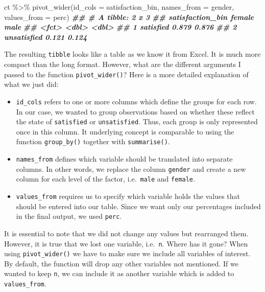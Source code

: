 \documentclass[
]{book}
\newenvironment{Shaded}{\begin{snugshade}}{\end{snugshade}}
\newcommand{\AttributeTok}[1]{\textcolor[rgb]{0.77,0.63,0.00}{#1}}
\newcommand{\DocumentationTok}[1]{\textcolor[rgb]{0.56,0.35,0.01}{\textbf{\textit{#1}}}}
\newcommand{\FunctionTok}[1]{\textcolor[rgb]{0.00,0.00,0.00}{#1}}
\newcommand{\NormalTok}[1]{#1}
\newcommand{\SpecialCharTok}[1]{\textcolor[rgb]{0.00,0.00,0.00}{#1}}
\begin{document}
\begin{Shaded}
\begin{Highlighting}[]
\NormalTok{ct }\SpecialCharTok{\%\textgreater{}\%} \FunctionTok{pivot\_wider}\NormalTok{(}\AttributeTok{id\_cols =}\NormalTok{ satisfaction\_bin,}
                   \AttributeTok{names\_from =}\NormalTok{ gender,}
                   \AttributeTok{values\_from =}\NormalTok{ perc)}
\DocumentationTok{\#\# \# A tibble: 2 x 3}
\DocumentationTok{\#\#   satisfaction\_bin female  male}
\DocumentationTok{\#\#   \textless{}fct\textgreater{}             \textless{}dbl\textgreater{} \textless{}dbl\textgreater{}}
\DocumentationTok{\#\# 1 satisfied         0.879 0.876}
\DocumentationTok{\#\# 2 unsatisfied       0.121 0.124}
\end{Highlighting}
\end{Shaded}

The resulting \texttt{tibble} looks like a table as we know it from Excel. It is much more compact than the long format. However, what are the different arguments I passed to the function \texttt{pivot\_wider()}? Here is a more detailed explanation of what we just did:

\begin{itemize}
\item
  \texttt{id\_cols} refers to one or more columns which define the groups for each row. In our case, we wanted to group observations based on whether these reflect the state of \texttt{satisfied} or \texttt{unsatisfied}. Thus, each group is only represented once in this column. It underlying concept is comparable to using the function \texttt{group\_by()} together with \texttt{summarise()}.
\item
  \texttt{names\_from} defines which variable should be translated into separate columns. In other words, we replace the column \texttt{gender} and create a new column for each level of the factor, i.e.~\texttt{male} and \texttt{female}.
\item
  \texttt{values\_from} requires us to specify which variable holds the values that should be entered into our table. Since we want only our percentages included in the final output, we used \texttt{perc}.
\end{itemize}

It is essential to note that we did not change any values but rearranged them. However, it is true that we lost one variable, i.e.~\texttt{n}. Where has it gone? When using \texttt{pivot\_wider()} we have to make sure we include all variables of interest. By default, the function will drop any other variables not mentioned. If we wanted to keep \texttt{n}, we can include it as another variable which is added to \texttt{values\_from}.
\end{document}
